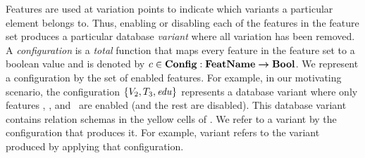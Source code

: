 Features are used at variation points to indicate which variants a particular
element belongs to.
Thus, enabling or disabling each of
the features in the feature set
produces a particular database \emph{variant} where
all variation has been removed. 
A \emph{configuration} is a \emph{total} function
that maps every feature in the feature set to a boolean value and is denoted
by $\config \in \confSet : \fSet \totype \bSet$.
We represent a configuration by the set of enabled features.
For example, in our motivating scenario, the configuration \ensuremath{
\setDef {\vTwo,\tThree,\edu}
}
represents a database variant where only features \vTwo, \tThree, and \edu\ are
enabled (and the rest are disabled).
This database variant contains relation schemas in the yellow cells of .
We refer to a variant by the configuration that produces it.
For example, 
variant \setDef {\vTwo,\tThree,\edu} refers to the variant produced by applying
that configuration.

